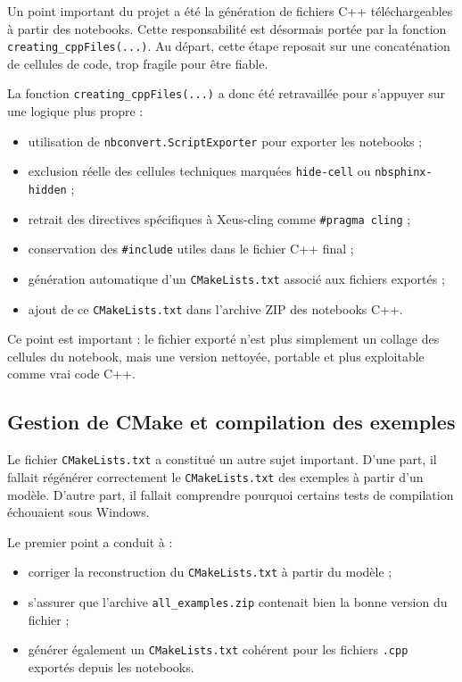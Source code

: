\documentclass[a4paper,12pt,twoside]{article}
\begin{document}
Un point important du projet a été la génération de fichiers C++ téléchargeables à partir des notebooks. Cette responsabilité est désormais portée par la fonction \texttt{creating\_cppFiles(...)}. Au départ, cette étape reposait sur une concaténation de cellules de code, trop fragile pour être fiable.

La fonction \texttt{creating\_cppFiles(...)} a donc été retravaillée pour s'appuyer sur une logique plus propre :
\begin{itemize}
    \item utilisation de \texttt{nbconvert.ScriptExporter} pour exporter les notebooks ;
    \item exclusion réelle des cellules techniques marquées \texttt{hide-cell} ou \texttt{nbsphinx-hidden} ;
    \item retrait des directives spécifiques à Xeus-cling comme \texttt{\#pragma cling} ;
    \item conservation des \texttt{\#include} utiles dans le fichier C++ final ;
    \item génération automatique d'un \texttt{CMakeLists.txt} associé aux fichiers exportés ;
    \item ajout de ce \texttt{CMakeLists.txt} dans l'archive ZIP des notebooks C++.
\end{itemize}

Ce point est important : le fichier exporté n'est plus simplement un collage des cellules du notebook, mais une version nettoyée, portable et plus exploitable comme vrai code C++.

\subsection{Gestion de CMake et compilation des exemples}

Le fichier \texttt{CMakeLists.txt} a constitué un autre sujet important. D'une part, il fallait régénérer correctement le \texttt{CMakeLists.txt} des exemples à partir d'un modèle. D'autre part, il fallait comprendre pourquoi certains tests de compilation échouaient sous Windows.

Le premier point a conduit à :
\begin{itemize}
    \item corriger la reconstruction du \texttt{CMakeLists.txt} à partir du modèle ;
    \item s'assurer que l'archive \texttt{all\_examples.zip} contenait bien la bonne version du fichier ;
    \item générer également un \texttt{CMakeLists.txt} cohérent pour les fichiers \texttt{.cpp} exportés depuis les notebooks.
\end{itemize}
\end{document}

